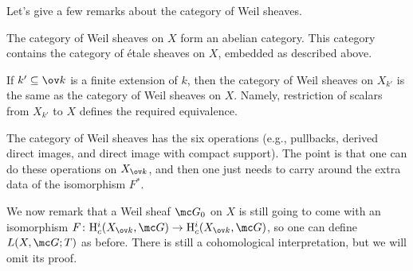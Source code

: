 \documentclass[../notes.tex]{subfiles}
\begin{document}
Let's give a few remarks about the category of Weil sheaves.
\begin{remark}
	The category of Weil sheaves on $X$ form an abelian category. This category contains the category of \'etale sheaves on $X$, embedded as described above.
\end{remark}
\begin{remark}
	If $k'\subseteq\ov k$ is a finite extension of $k$, then the category of Weil sheaves on $X_{k'}$ is the same as the category of Weil sheaves on $X$. Namely, restriction of scalars from $X_{k'}$ to $X$ defines the required equivalence.
\end{remark}
\begin{remark}
	The category of Weil sheaves has the six operations (e.g., pullbacks, derived direct images, and direct image with compact support). The point is that one can do these operations on $X_{\ov k}$, and then one just needs to carry around the extra data of the isomorphism $F^*$.
\end{remark}
We now remark that a Weil sheaf $\mc G_0$ on $X$ is still going to come with an isomorphism $F\colon\mathrm H^i_c(X_{\ov k},\mc G)\to\mathrm H^i_c(X_{\ov k},\mc G)$, so one can define $L(X,\mc G;T)$ as before. There is still a cohomological interpretation, but we will omit its proof.
\end{document}
